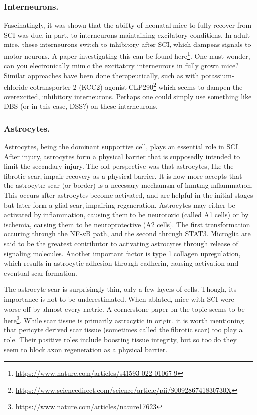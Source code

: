 \documentclass[12pt]{report}
\begin{document}
\subsubsection{Interneurons.}
Fascinatingly, it was shown that the ability of neonatal mice to fully recover from SCI was due, in part, to interneurons maintaining excitatory conditions. In adult mice, these interneurons switch to inhibitory after SCI, which dampens signals to motor neurons. A paper investigating this can be found here\footnote{\url{https://www.nature.com/articles/s41593-022-01067-9}}. One must wonder, can you electronically mimic the excitatory interneurons in fully grown mice? Similar approaches have been done therapeutically, such as with potassium-chloride cotransporter-2 (KCC2) agonist CLP290\footnote{\url{https://www.sciencedirect.com/science/article/pii/S009286741830730X}} which seems to dampen the overexcited, inhibitory interneurons. Perhaps one could simply use something like DBS (or in this case, DSS?) on these interneurons.  

\subsubsection{Astrocytes.}
Astrocytes, being the dominant supportive cell, plays an essential role in SCI. After injury, astrocytes form a physical barrier that is supposedly intended to limit the secondary injury. The old perspective was that astrocytes, like the fibrotic scar, impair recovery as a physical barrier. It is now more accepts that the astrocytic scar (or border) is a necessary mechanism of limiting inflammation. This occurs after astrocytes become activated, and are helpful in the initial stages but later form a glial scar, impairing regeneration. Astrocytes may either be activated by inflammation, causing them to be neurotoxic (called A1 cells) or by ischemia, causing them to be neuroprotective (A2 cells). The first transformation occuring through the NF-$\kappa$B path, and the second through STAT3. Microglia are said to be the greatest contributor to activating astrocytes through release of signaling molecules. Another important factor is type 1 collagen upregulation, which results in astrocytic adhesion through cadherin, causing activation and eventual scar formation.\newline

The astrocyte scar is surprisingly thin, only a few layers of cells. Though, its importance is not to be underestimated. When ablated, mice with SCI were worse off by almost every metric. A cornerstone paper on the topic seems to be here\footnote{\url{https://www.nature.com/articles/nature17623}}. While scar tissue is primarily astrocytic in origin, it is worth mentioning that pericyte derived scar tissue (sometimes called the fibrotic scar) too play a role. Their positive roles include boosting tissue integrity, but so too do they seem to block axon regeneration as a physical barrier. 
\end{document}
